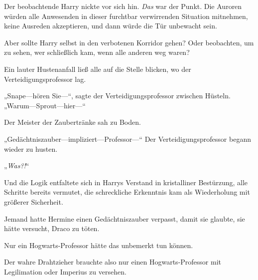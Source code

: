 Der beobachtende Harry nickte vor sich hin. \emph{Das} war der Punkt. Die Auroren würden alle Anwesenden in dieser furchtbar verwirrenden Situation mitnehmen, keine Ausreden akzeptieren, und dann würde die Tür unbewacht sein.

Aber sollte Harry selbst in den verbotenen Korridor gehen? Oder beobachten, um zu sehen, wer schließlich kam, wenn alle anderen weg waren?

Ein lauter Hustenanfall ließ alle auf die Stelle blicken, wo der Verteidigungsprofessor lag.

„Snape—hören Sie—“, sagte der Verteidigungsprofessor zwischen Hüsteln. „Warum—Sprout—hier—“

Der Meister der Zaubertränke sah zu Boden.

„Gedächtniszauber—impliziert—Professor—“
Der Verteidigungsprofessor begann wieder zu husten.

„\emph{Was?!}“

Und die Logik entfaltete sich in Harrys Verstand in kristalliner Bestürzung, alle Schritte bereits vermutet, die schreckliche Erkenntnis kam als Wiederholung mit größerer Sicherheit.

Jemand hatte Hermine einen Gedächtniszauber verpasst, damit sie glaubte, sie hätte versucht, Draco zu töten.

Nur ein Hogwarts-Professor hätte das unbemerkt tun können.

Der wahre Drahtzieher brauchte also nur einen Hogwarts-Professor mit Legilimation oder Imperius zu versehen.

